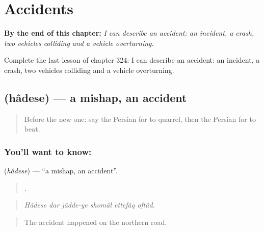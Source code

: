 
\chapter{Accidents}
\label{ch:fa-accidents}

\begin{chapteropening}
\textbf{By the end of this chapter:} \emph{I can describe an accident: an incident, a crash, two vehicles colliding and a vehicle overturning.}

Complete the last lesson of chapter 324: I can describe an accident: an incident, a crash, two vehicles colliding and a vehicle overturning.
\end{chapteropening}

\section[\texorpdfstring{\fa{حادثه} (hâdese)}{حادثه (hâdese)}]{ (hâdese) — a mishap, an accident}

\label{lesson:FA-C324-hadese}



\begin{quote}
Before the new one: say the Persian for to quarrel, then the Persian for to beat.
\end{quote}

\subsection*{You'll want to know: }
\textbf{} (\emph{hâdese}) — \textquotedblleft{}a mishap, an accident\textquotedblright{}.

\begin{quote}
     .
\end{quote}

\begin{quote}
\emph{Hâdese dar jâdde-ye shomâl ettefâq oftâd.}
\end{quote}

\begin{quote}
The accident happened on the northern road.
\end{quote}

